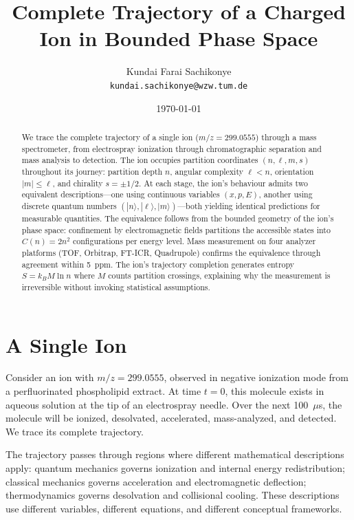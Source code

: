 \documentclass[12pt,a4paper]{article}
\title{\textbf{Complete Trajectory of a Charged Ion in Bounded Phase Space}}
\author{
Kundai Farai Sachikonye\\
\texttt{kundai.sachikonye@wzw.tum.de}
}
\date{\today}
\theoremstyle{remark}
\begin{document}
\maketitle

\begin{abstract}
We trace the complete trajectory of a single ion ($m/z = 299.0555$) through a mass spectrometer, from electrospray ionization through chromatographic separation and mass analysis to detection. The ion occupies partition coordinates $(n, \ell, m, s)$ throughout its journey: partition depth $n$, angular complexity $\ell < n$, orientation $|m| \leq \ell$, and chirality $s = \pm 1/2$. At each stage, the ion's behaviour admits two equivalent descriptions---one using continuous variables $(x, p, E)$, another using discrete quantum numbers $(|n\rangle, |\ell\rangle, |m\rangle)$---both yielding identical predictions for measurable quantities. The equivalence follows from the bounded geometry of the ion's phase space: confinement by electromagnetic fields partitions the accessible states into $C(n) = 2n^2$ configurations per energy level. Mass measurement on four analyzer platforms (TOF, Orbitrap, FT-ICR, Quadrupole) confirms the equivalence through agreement within 5~ppm. The ion's trajectory completion generates entropy $S = k_B M \ln n$ where $M$ counts partition crossings, explaining why the measurement is irreversible without invoking statistical assumptions.
\end{abstract}


\tableofcontents
\newpage

\section{A Single Ion}
\label{sec:single-ion}

Consider an ion with $m/z = 299.0555$, observed in negative ionization mode from a perfluorinated phospholipid extract. At time $t = 0$, this molecule exists in aqueous solution at the tip of an electrospray needle. Over the next 100~$\mu$s, the molecule will be ionized, desolvated, accelerated, mass-analyzed, and detected. We trace its complete trajectory.

The trajectory passes through regions where different mathematical descriptions apply: quantum mechanics governs ionization and internal energy redistribution; classical mechanics governs acceleration and electromagnetic deflection; thermodynamics governs desolvation and collisional cooling. These descriptions use different variables, different equations, and different conceptual frameworks.
\end{document}
